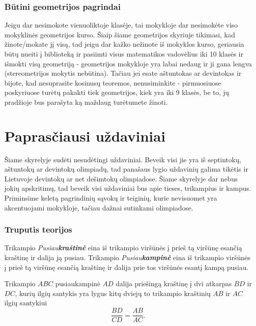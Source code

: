 \subsubsection{Būtini geometrijos pagrindai}

Jeigu dar nesimokote vienuoliktoje klasėje, tai mokykloje dar nesimokėte
viso mokyklinės geometrijos kurso. Šiaip šiame geometrijos skyriuje
tikimasi, kad žinote/mokate jį visą, tad jeigu dar kažko nežinote iš
mokyklos kurso, geriausia būtų nueiti į biblioteką ir pasiimti visus
matematikos vadovėlius iki 10 klasės ir išmokti visą geometriją -
geometrijos mokykloje yra labai nedaug ir ji gana lengva (stereometrijos
mokytis nebūtina). Tačiau jei esate aštuntokas ar devintokas ir bijote, kad
nesuprasite kosinusų teoremos, nenusiminkite - pirmuosiuose poskyriuose
turėtų pakakti tiek geometrijos, kiek yra iki 9 klasės, be to, jų pradžioje
bus parašyta ką maždaug turėtumete žinoti.

\newpage
\section{Paprasčiausi uždaviniai} 
  
Šiame skyrelyje sudėti nesudėtingi uždaviniai. Beveik visi jie yra iš
septintokų, aštuntokų ar devintokų olimpiadų, tad panašaus lygio uždavinių
galima tikėtis ir Lietuvoje devintokų ar net dešimtokų olimpiadose. Šiame
skyrelyje dar nebus jokių apskritimų, tad beveik visi uždaviniai bus apie
tieses, trikampius ir kampus. Priminsime keletą pagrindinių sąvokų ir
teiginių, kurie nevisuomet yra akcentuojami mokykloje, tačiau dažnai
sutinkami olimpiadose. 

\subsubsection{Truputis teorijos}

\begin{api}
  Trikampio \emph{Pusiau\textbf{kraštinė}} eina iš trikampio viršūnės į
  prieš tą viršūnę esančią kraštinę ir dalija ją pusiau. Trikampio
  \emph{Pusiau\textbf{kampinė}} eina iš trikampio viršūnės į prieš tą
  viršūnę esančią kraštinę ir dalija prie tos viršūnės esantį kampą pusiau.
\end{api}

\begin{teig}
  Trikampio $ABC$ pusiaukampinė $AD$ dalija priešingą kraštinę į dvi
  atkarpas $BD$ ir $DC$, kurių ilgių santykis yra lygus kitų dviejų to
  trikampio kraštinių $AB$ ir $AC$ ilgių santykiui
  $$\frac{BD}{CD}=\frac{AB}{AC}.$$
\end{teig}

